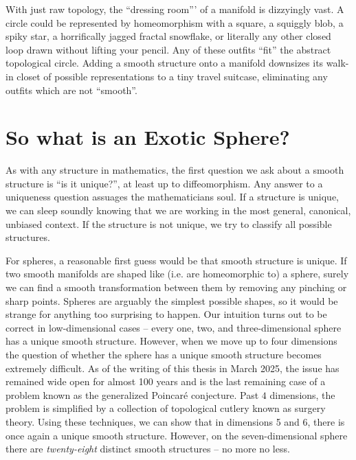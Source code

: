 With just raw topology, the ``dressing room''' of a manifold is dizzyingly vast.
A circle could be represented by homeomorphism with a square, a squiggly blob, a spiky star, a horrifically jagged fractal snowflake, or literally any other closed loop drawn without lifting your pencil. Any of these outfits ``fit'' the abstract topological circle.
Adding a smooth structure onto a manifold downsizes its walk-in closet of possible representations to a tiny travel suitcase, eliminating any outfits which are not ``smooth''.

\section*{So what is an Exotic Sphere?}

As with any structure in mathematics, the first question we ask about a smooth structure is ``is it unique?'', at least up to diffeomorphism. Any answer to a uniqueness question assuages the mathematicians soul. If a structure is unique, we can sleep soundly knowing that we are working in the most general, canonical, unbiased context. If the structure is not unique, we try to classify all possible structures.

For spheres, a reasonable first guess would be that smooth structure is unique. If two smooth manifolds are shaped like (i.e. are homeomorphic to) a sphere, surely we can find a smooth transformation between them by removing any pinching or sharp points. Spheres are arguably the simplest possible shapes, so it would be strange for anything too surprising to happen. Our intuition turns out to be correct in low-dimensional cases -- every one, two, and three-dimensional sphere has a unique smooth structure. 
%
However, when we move up to four dimensions the question of whether the sphere has a unique smooth structure becomes extremely difficult. As of the writing of this thesis in March 2025, the issue has remained wide open for almost 100 years and is the last remaining case of a problem known as the generalized Poincar\'e conjecture. Past $4$ dimensions, the problem is simplified by a collection of topological cutlery known as surgery theory.
Using these techniques, we can show that in dimensions 5 and 6, there is once again a unique smooth structure. However, on the seven-dimensional sphere there are \emph{twenty-eight} distinct smooth structures -- no more no less. 


